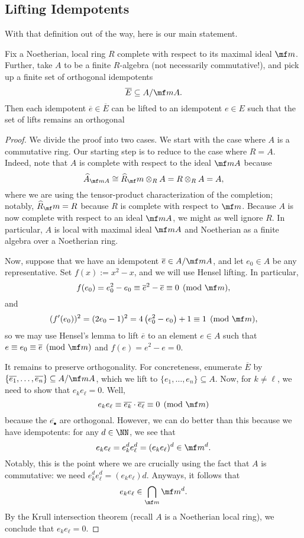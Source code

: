 \subsection{Lifting Idempotents}
With that definition out of the way, here is our main statement.
\begin{proposition} \label{prop:liftidemp}
	Fix a Noetherian, local ring $R$ complete with respect to its maximal ideal $\mf m$. Further, take $A$ to be a finite $R$-algebra (not necessarily commutative!), and pick up a finite set of orthogonal idempotents
	\[\overline E\subseteq A/\mf mA.\]
	Then each idempotent $\overline e\in\overline E$ can be lifted to an idempotent $e\in E$ such that the set of lifts remains an orthogonal 
\end{proposition}
\begin{proof}
	We divide the proof into two cases. We start with the case where $A$ is a commutative ring. Our starting step is to reduce to the case where $R=A$. Indeed, note that $A$ is complete with respect to the ideal $\mf mA$ because
	\[\widehat A_{\mf mA}\cong\widehat R_\mf m\otimes_RA=R\otimes_RA=A,\]
	where we are using the tensor-product characterization of the completion; notably, $\widehat R_\mf m=R$ because $R$ is complete with respect to $\mf m$. Because $A$ is now complete with respect to an ideal $\mf mA$, we might as well ignore $R$. In particular, $A$ is local with maximal ideal $\mf mA$ and Noetherian as a finite algebra over a Noetherian ring.

	Now, suppose that we have an idempotent $\overline e\in A/\mf mA$, and let $e_0\in A$ be any representative. Set $f(x):=x^2-x$, and we will use Hensel lifting. In particular,
	\[f(e_0)=e_0^2-e_0\equiv\overline e^2-\overline e\equiv0\pmod{\mf m},\]
	and
	\[(f'(e_0))^2=(2e_0-1)^2=4\left(e_0^2-e_0\right)+1\equiv1\pmod{\mf m},\]
	so we may use Hensel's lemma to lift $\overline e$ to an element $e\in A$ such that $e\equiv e_0\equiv\overline e\pmod{\mf m}$ and $f(e)=e^2-e=0$.

	It remains to preserve orthogonality. For concreteness, enumerate $\overline E$ by $\{\overline{e_1},\ldots,\overline{e_n}\}\subseteq A/\mf mA$, which we lift to $\{e_1,\ldots,e_n\}\subseteq A$. Now, for $k\ne\ell$, we need to show that $e_ke_\ell=0$. Well,
	\[e_ke_\ell\equiv\overline{e_k}\cdot\overline{e_\ell}\equiv0\pmod{\mf m}\]
	because the $\overline{e_\bullet}$ are orthogonal. However, we can do better than this because we have idempotents: for any $d\in\NN$, we see that
	\[e_ke_\ell=e_k^de_\ell^d=(e_ke_\ell)^d\in\mf m^d.\]
	Notably, this is the point where we are crucially using the fact that $A$ is commutative: we need $e_k^de_\ell^d=(e_ke_\ell)d$. Anyways, it follows that
	\[e_ke_\ell\in\bigcap_{\mf m}\mf m^d.\]
	By the Krull intersection theorem (recall $A$ is a Noetherian local ring), we conclude that $e_ke_\ell=0$.


\end{proof}
